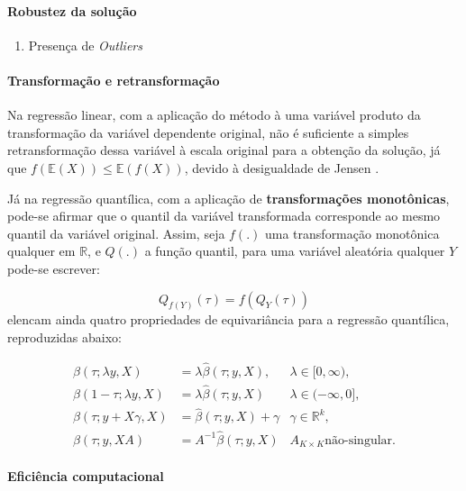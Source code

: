 \documentclass[a4paper, 12pt]{article}
\providecommand{\tightlist}{%
  \setlength{\itemsep}{0pt}\setlength{\parskip}{0pt}}
\let\oldparagraph\paragraph
\renewcommand{\paragraph}[1]{\oldparagraph{#1}\mbox{}}
\begin{document}
\hypertarget{robustez-da-solucao}{%
\paragraph{Robustez da solução}\label{robustez-da-solucao}}

\begin{enumerate}
\def\labelenumi{\alph{enumi}.}
\tightlist
\item
  Presença de \emph{Outliers}
\end{enumerate}

\hypertarget{transformacao-e-retransformacao}{%
\paragraph{Transformação e
retransformação}\label{transformacao-e-retransformacao}}

Na regressão linear, com a aplicação do método à uma variável produto da
transformação da variável dependente original, não é suficiente a
simples retransformação dessa variável à escala original para a obtenção
da solução, já que \(f(\mathbb{E}(X)) \leq \mathbb{E}(f(X))\), devido à
desigualdade de Jensen \autocite[ver][p.~207]{moda_media_mediana}.

Já na regressão quantílica, com a aplicação de \textbf{transformações
monotônicas}, pode-se afirmar que o quantil da variável transformada
corresponde ao mesmo quantil da variável original. Assim, seja \(f(.)\)
uma transformação monotônica qualquer em \(\mathbb{R}\), e \(Q(.)\) a
função quantil, para uma variável aleatória qualquer \(Y\) pode-se
escrever:

\[Q_{f(Y)}(\tau) = f(Q_Y(\tau))\] \textcite[p.~39-40]{koenker1978}
elencam ainda quatro propriedades de equivariância para a regressão
quantílica, reproduzidas abaixo:

\[
\begin{aligned}
\hat \beta(\tau;\lambda y,X) &= \lambda \hat \beta(\tau; y, X), & \lambda \in[0,\infty), \\
\hat \beta(1-\tau;\lambda y,X) &= \lambda \hat \beta(\tau; y, X) & \lambda \in (-\infty,0],\\
\hat \beta(\tau;y + X\gamma,X)& = \hat \beta(\tau; y, X) + \gamma & \gamma \in \mathbb{R}^k,\\
\hat \beta(\tau;y,XA) &= A^{-1} \hat \beta(\tau; y, X) & A_{K \times K} \text{não-singular.}
\end{aligned}
\]

\hypertarget{eficiencia-computacional}{%
\paragraph{Eficiência computacional}\label{eficiencia-computacional}}
\end{document}
